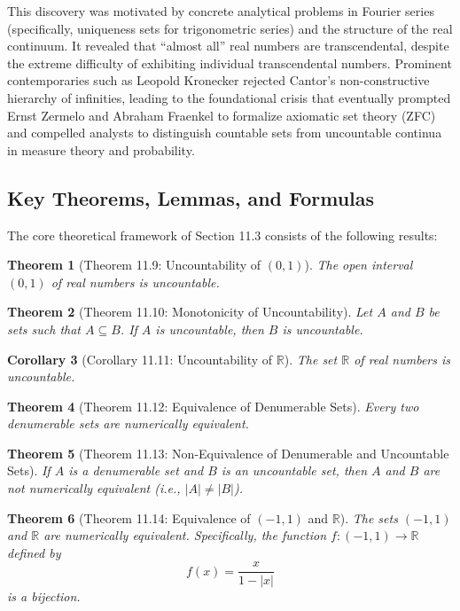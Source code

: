 \documentclass[11pt, letterpaper]{article}
\newtheorem{theorem}{Theorem}[section]
\newtheorem{corollary}[theorem]{Corollary}
\theoremstyle{definition}
\theoremstyle{remark}
\begin{document}
This discovery was motivated by concrete analytical problems in Fourier series (specifically, uniqueness sets for trigonometric series) and the structure of the real continuum. It revealed that ``almost all'' real numbers are transcendental, despite the extreme difficulty of exhibiting individual transcendental numbers. Prominent contemporaries such as Leopold Kronecker rejected Cantor's non-constructive hierarchy of infinities, leading to the foundational crisis that eventually prompted Ernst Zermelo and Abraham Fraenkel to formalize axiomatic set theory (ZFC) and compelled analysts to distinguish countable sets from uncountable continua in measure theory and probability.

\subsection{Key Theorems, Lemmas, and Formulas}

The core theoretical framework of Section 11.3 consists of the following results:

\begin{theorem}[Theorem 11.9: Uncountability of $(0, 1)$]
The open interval $(0, 1)$ of real numbers is uncountable.
\end{theorem}

\begin{theorem}[Theorem 11.10: Monotonicity of Uncountability]
Let $A$ and $B$ be sets such that $A \subseteq B$. If $A$ is uncountable, then $B$ is uncountable.
\end{theorem}

\begin{corollary}[Corollary 11.11: Uncountability of $\mathbb{R}$]
The set $\mathbb{R}$ of real numbers is uncountable.
\end{corollary}

\begin{theorem}[Theorem 11.12: Equivalence of Denumerable Sets]
Every two denumerable sets are numerically equivalent.
\end{theorem}

\begin{theorem}[Theorem 11.13: Non-Equivalence of Denumerable and Uncountable Sets]
If $A$ is a denumerable set and $B$ is an uncountable set, then $A$ and $B$ are not numerically equivalent (i.e., $|A| \neq |B|$).
\end{theorem}

\begin{theorem}[Theorem 11.14: Equivalence of $(-1, 1)$ and $\mathbb{R}$]
The sets $(-1, 1)$ and $\mathbb{R}$ are numerically equivalent. Specifically, the function $f : (-1, 1) \to \mathbb{R}$ defined by
\[
f(x) = \frac{x}{1 - |x|}
\]
is a bijection.
\end{theorem}
\end{document}
